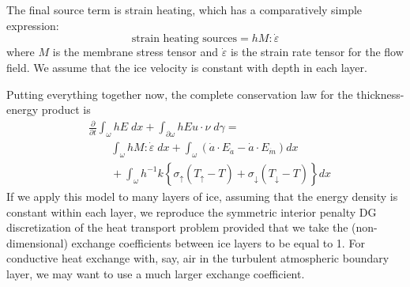 \documentclass{article}
\theoremstyle{definition}
\theoremstyle{plain}
\begin{document}
The final source term is strain heating, which has a comparatively simple expression:
\begin{equation}
    \text{strain heating sources} = h M : \dot\varepsilon
\end{equation}
where $M$ is the membrane stress tensor and $\dot\varepsilon$ is the strain rate tensor for the flow field.
We assume that the ice velocity is constant with depth in each layer.

Putting everything together now, the complete conservation law for the thickness-energy product is
\begin{align}
    & \frac{\partial}{\partial t}\int_\omega hE\;dx + \int_{\partial\omega}hEu\cdot\nu\;d\gamma = \\
    & \qquad \int_\omega h M:\dot\varepsilon\;dx + \int_\omega\left(\dot a\cdot E_{\dot a} - \dot a\cdot E_{\dot m}\right)dx \\
    & \qquad + \int_\omega h^{-1}k\left\{\sigma_{\uparrow}(T_{\uparrow} - T) + \sigma_{\downarrow}(T_{\downarrow} - T)\right\}dx
\end{align}
If we apply this model to many layers of ice, assuming that the energy density is constant within each layer, we reproduce the symmetric interior penalty DG discretization of the heat transport problem provided that we take the (non-dimensional) exchange coefficients between ice layers to be equal to 1.
For conductive heat exchange with, say, air in the turbulent atmospheric boundary layer, we may want to use a much larger exchange coefficient.


\pagebreak



\end{document}

